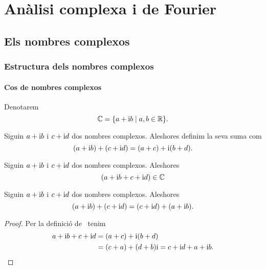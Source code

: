\documentclass[../Apunts.tex]{subfiles}
\begin{document}
\part{Anàlisi complexa i de Fourier}
\chapter{Els nombres complexos}
\section{Estructura dels nombres complexos}
	\subsection{Cos de nombres complexos}
	\begin{notation}
		\label{notation:cos de nombres complexos}
		Denotarem
		\[\mathbb{C}=\{a+\mathrm{i} b\mid a,b\in\mathbb{R}\}.\]
	\end{notation}
	\begin{definition}
		\label{def:suma de nombres complexos}
		Siguin \(a+\mathrm{i} b\) i \(c+\mathrm{i} d\) dos nombres complexos. Aleshores definim la seva suma com
		\[(a+\mathrm{i} b)+(c+\mathrm{i} d)=(a+c)+\mathrm{i}(b+d).\]
	\end{definition}
	\begin{observation}
		\label{obs:els nombres complexos estan tancats per la suma}
		Siguin \(a+\mathrm{i} b\) i \(c+\mathrm{i} d\) dos nombres complexos. Aleshores
		\[(a+\mathrm{i} b+c+\mathrm{i} d)\in\mathbb{C}\]
	\end{observation}
	\begin{proposition}
		\label{prop:els nombres complexos commuten per la suma}
		\label{prop:el producte de nombres complexos és commutatiu}
		Siguin \(a+\mathrm{i} b\) i \(c+\mathrm{i} d\) dos nombres complexos. Aleshores
		\[(a+\mathrm{i} b)+(c+\mathrm{i} d)=(c+\mathrm{i} d)+(a+\mathrm{i} b).\]
		\begin{proof}
			Per la definició de~ tenim
			\begin{align*}
				a+\mathrm{i} b+c+\mathrm{i} d&=(a+c)+\mathrm{i}(b+d) \\
				&=(c+a)+(d+b)\mathrm{i}=c+\mathrm{i} d+a+\mathrm{i} b.\qedhere
			\end{align*}
		\end{proof}
	\end{proposition}
\end{document}
